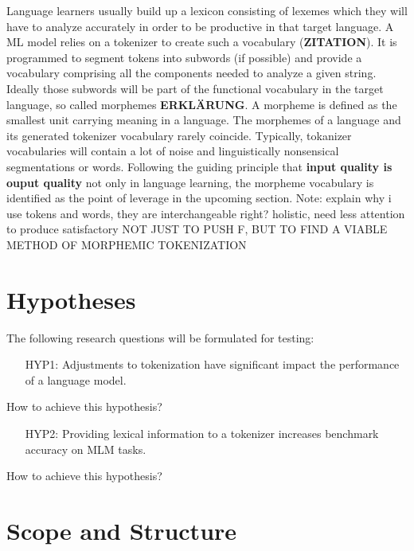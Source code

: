 Language learners usually build up a lexicon consisting of lexemes which they will have to analyze accurately in order to be productive in that target language.
A ML model relies on a tokenizer to create such a vocabulary  (\textbf{ZITATION}).
It is programmed to segment tokens into subwords (if possible) and provide a vocabulary comprising all the components needed to analyze a given string.
Ideally those subwords will be part of the functional vocabulary in the target language, so called morphemes \textbf{ERKLÄRUNG}.
A morpheme is defined as the smallest unit carrying meaning in a language.
The morphemes of a language and its generated tokenizer vocabulary rarely coincide.
Typically, tokanizer vocabularies will contain a lot of noise and linguistically nonsensical segmentations or words.
Following the guiding principle that \textbf{input quality is ouput quality} not only in language learning, the morpheme vocabulary is identified as the point of leverage in the upcoming section.
Note: explain why i use tokens and words, they are interchangeable right?
holistic, need less attention to produce satisfactory
\uppercase{not just to push F, but to find a viable method of morphemic tokenization}

\section{Hypotheses}
\label{sec:hypothesis}

The following research questions will be formulated for testing:
\begin{framed}
    \begin{itemize}[itemindent=1em]
        \item[HYP1:] Adjustments to tokenization have significant impact the performance of a language model.
    \end{itemize}
\end{framed}
How to achieve this hypothesis?
\begin{framed}
    \begin{itemize}[itemindent=1em]
        \item[HYP2:] Providing lexical information to a tokenizer increases benchmark accuracy on MLM tasks.
    \end{itemize}
\end{framed}
How to achieve this hypothesis?

\section{Scope and Structure}
\label{sec:scope-and-structure}


